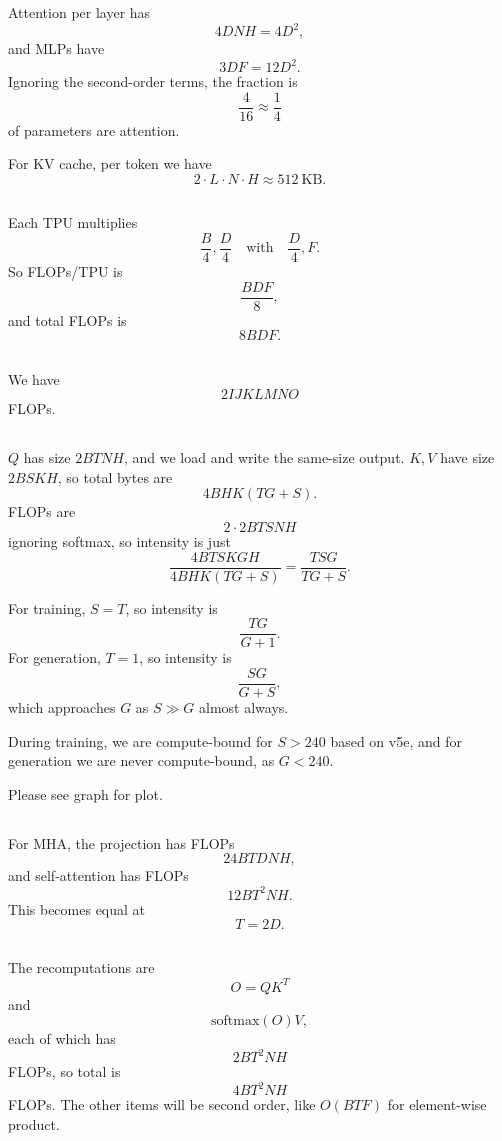 \documentclass[11pt]{article}
\newcommand{\B}{B}
\newcommand{\D}{D}
\newcommand{\F}{F}
\newcommand{\exercisebreak}{\Needspace{8\baselineskip}}
\begin{document}
Attention per layer has
\[
  4\D N H = 4\D^2,
\]
and MLPs have
\[
  3\D\F = 12\D^2.
\]
Ignoring the second-order terms, the fraction is
\[
  \frac{4}{16}\approx \frac14
\]
of parameters are attention.

For KV cache, per token we have
\[
  2\cdot L\cdot N\cdot H \approx 512\ \mathrm{KB}.
\]

\exercisebreak
\subsection{}
Each TPU multiplies
\[
  \frac{\B}{4},\frac{\D}{4}
  \quad\text{with}\quad
  \frac{\D}{4},\F.
\]
So FLOPs/TPU is
\[
  \frac{\B\D\F}{8},
\]
and total FLOPs is
\[
  8\B\D\F.
\]

\exercisebreak
\subsection{}
We have
\[
  2IJKLMNO
\]
FLOPs.

\exercisebreak
\subsection{}
$Q$ has size $2BTN H$, and we load and write the same-size output. $K,V$ have size $2BSKH$, so total bytes are
\[
  4BHK(TG+S).
\]
FLOPs are
\[
  2\cdot 2BTSNH
\]
ignoring softmax, so intensity is just
\[
  \frac{4BTSKGH}{4BHK(TG+S)}
  =
  \frac{TSG}{TG+S}.
\]

For training, $S=T$, so intensity is
\[
  \frac{TG}{G+1}.
\]
For generation, $T=1$, so intensity is
\[
  \frac{SG}{G+S},
\]
which approaches $G$ as $S\gg G$ almost always.

During training, we are compute-bound for $S>240$ based on v5e, and for generation we are never compute-bound, as $G<240$.

Please see graph for plot.

\exercisebreak
\subsection{}
For MHA, the projection has FLOPs
\[
  24BTDNH,
\]
and self-attention has FLOPs
\[
  12BT^2NH.
\]
This becomes equal at
\[
  T=2\D.
\]

\exercisebreak
\subsection{}
The recomputations are
\[
  O=QK^T
\]
and
\[
  \mathrm{softmax}(O)V,
\]
each of which has
\[
  2BT^2NH
\]
FLOPs, so total is
\[
  4BT^2NH
\]
FLOPs. The other items will be second order, like $O(BTF)$ for element-wise product.
\end{document}
